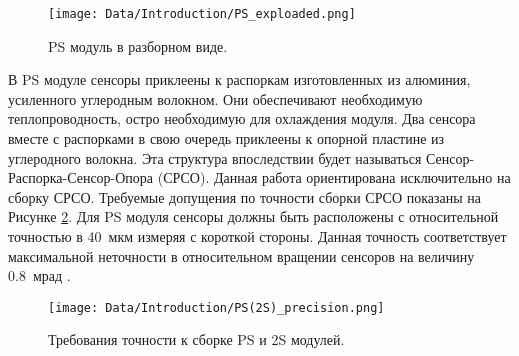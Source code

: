 \begin{figure}[ht]\centering
\texttt{[image: Data/Introduction/PS\_exploaded.png]}
\caption{PS модуль в разборном виде.}
\label{fig:ps_exploaded}
\end{figure}

В PS модуле сенсоры приклеены к распоркам изготовленных из алюминия, усиленного углеродным волокном. Они обеспечивают необходимую теплопроводность, остро необходимую для охлаждения модуля. Два сенсора вместе с распорками в свою очередь приклеены к опорной пластине из углеродного волокна. Эта структура впоследствии будет называться Сенсор-Распорка-Сенсор-Опора (СРСО). Данная работа ориентирована исключительно на сборку 
СРСО. Требуемые допущения по точности сборки СРСО показаны на Рисунке \ref{fig:ps(2s)_precision}. Для PS модуля сенсоры должны быть расположены с относительной точностью в 40~мкм измеряя с короткой стороны. Данная точность соответствует максимальной неточности в относительном вращении сенсоров на величину 0.8~мрад \cite{AutomatedAssembly_tutorial}.

\begin{figure}[ht]\centering
\texttt{[image: Data/Introduction/PS(2S)\_precision.png]}
\caption{Требования точности к сборке PS и 2S модулей.}
\label{fig:ps(2s)_precision}
\end{figure}
